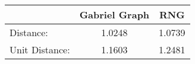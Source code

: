 \begin{tabular}{l|c|c|}
 & Gabriel Graph & RNG\\
\hline
Distance: & 1.0248 & 1.0739\\
Unit Distance: & 1.1603 & 1.2481\\
\end{tabular}